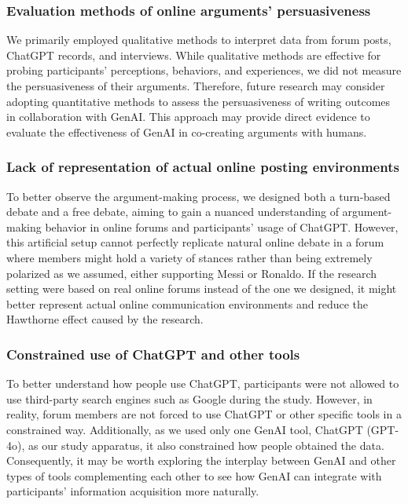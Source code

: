 \subsubsection{Evaluation methods of online arguments' persuasiveness}
We primarily employed qualitative methods to interpret data from forum posts, ChatGPT records, and interviews. While qualitative methods are effective for probing participants' perceptions, behaviors, and experiences, we did not measure the persuasiveness of their arguments. Therefore, future research may consider adopting quantitative methods to assess the persuasiveness of writing outcomes in collaboration with GenAI. This approach may provide direct evidence to evaluate the effectiveness of GenAI in co-creating arguments with humans.


\subsubsection{Lack of representation of actual online posting environments}
To better observe the argument-making process, we designed both a turn-based debate and a free debate, aiming to gain a nuanced understanding of argument-making behavior in online forums and participants' usage of ChatGPT. However, this artificial setup cannot perfectly replicate natural online debate in a forum where members might hold a variety of stances rather than being extremely polarized as we assumed, either supporting Messi or Ronaldo. If the research setting were based on real online forums instead of the one we designed, it might better represent actual online communication environments and reduce the Hawthorne effect caused by the research.

\subsubsection{Constrained use of ChatGPT and other tools}
To better understand how people use ChatGPT, participants were not allowed to use third-party search engines such as Google during the study. However, in reality, forum members are not forced to use ChatGPT or other specific tools in a constrained way. Additionally, as we used only one GenAI tool, ChatGPT (GPT-4o), as our study apparatus, it also constrained how people obtained the data. Consequently, it may be worth exploring the interplay between GenAI and other types of tools complementing each other to see how GenAI can integrate with participants' information acquisition more naturally.
